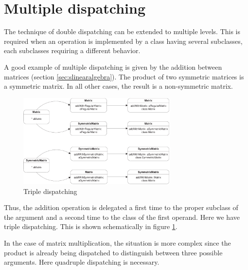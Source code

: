 \documentclass[twoside]{book}
\begin{document}
\section{Multiple dispatching}
\label{sec:multipledisp}The technique of double dispatching can be
extended to multiple levels. This is required when an operation is
implemented by a class having several subclasses, each subclasses
requiring a different behavior.

A good example of multiple dispatching is given by the addition
between matrices (\cf section \ref{sec:slinearalgebra}). The
product of two symmetric matrices is a symmetric matrix. In all
other cases, the result is a non-symmetric matrix.
\begin{figure}
\centering\includegraphics[width=8cm]{Figures/TripleDispatching}
\caption{Triple dispatching}\label{fig:tripledispatch}
\end{figure}
Thus, the addition operation is delegated a first time to the
proper subclass of the argument and a second time to the class of
the first operand. Here we have triple dispatching. This is shown
schematically in figure \ref{fig:tripledispatch}.

In the case of matrix multiplication, the situation is more
complex since the product is already being dispatched to
distinguish between three possible arguments. Here quadruple
dispatching is necessary.


\ifx\wholebook\relax\else
\end{document}
